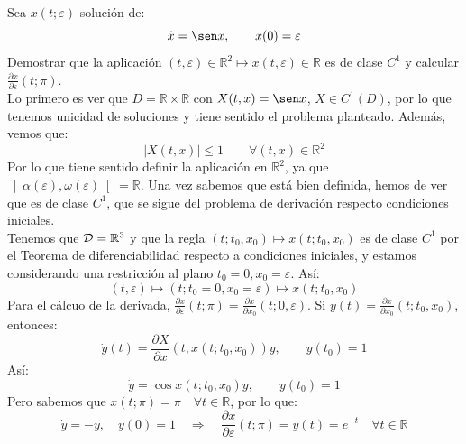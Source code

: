 \documentclass[12pt]{article}
\begin{document}
    \newpage
    \begin{ejercicio}
        Sea $x(t;\varepsilon)$ solución de:
        \begin{equation*}
            \dot{x} = \sen x, \qquad x(0) = \varepsilon
        \end{equation*}
        Demostrar que la aplicación $(t,\varepsilon)\in \mathbb{R}^2\longmapsto x(t,\varepsilon)\in \mathbb{R}$ es de clase $C^1$ y calcular $\frac{\partial x}{\partial \varepsilon}(t;\pi)$.\\

        \noindent
        Lo primero es ver que $D = \mathbb{R}\times \mathbb{R}$ con $X(t,x)=\sen x$, $X\in C^1(D)$,  por lo que tenemos unicidad de soluciones y tiene sentido el problema planteado. Además, vemos que:
        \begin{equation*}
            |X(t,x)| \leq 1 \qquad \forall (t,x)\in \mathbb{R}^2
        \end{equation*}
        Por lo que tiene sentido definir la aplicación en $\mathbb{R}^2$, ya que $\left]\alpha(\varepsilon),\omega(\varepsilon)\right[= \mathbb{R}$. Una vez sabemos que está bien definida, hemos de ver que es de clase $C^1$, que se sigue del problema de derivación respecto condiciones iniciales.\\

        \noindent
        Tenemos que $\mathcal{D} = \mathbb{R}^3$ y que la regla $(t;t_0,x_0)\longmapsto x(t;t_0,x_0)$ es de clase $C^1$ por el Teorema de diferenciabilidad respecto a condiciones iniciales, y estamos considerando una restricción al plano $t_0=0, x_0=\varepsilon$. Así:
        \begin{equation*}
            (t,\varepsilon)\longmapsto (t;t_0=0,x_0=\varepsilon)\longmapsto x(t;t_0,x_0)
        \end{equation*}
        Para el cálcuo de la derivada, $\frac{\partial x}{\partial \varepsilon}(t;\pi) = \frac{\partial x}{\partial x_0}(t;0,\varepsilon)$. Si $y(t) = \frac{\partial x}{\partial x_0}(t;t_0,x_0)$, entonces:
        \begin{equation*}
            \dot{y}(t) = \frac{\partial X}{\partial x}(t,x(t;t_0,x_0))y, \qquad y(t_0) = 1
        \end{equation*}
        Así:
        \begin{equation*}
            \dot{y} = \cos x(t;t_0,x_0) y, \qquad y(t_0) = 1
        \end{equation*}
        Pero sabemos que $x(t;\pi) = \pi \quad \forall t\in \mathbb{R}$, por lo que:
        \begin{equation*}
            \dot{y} = -y, \quad y(0) = 1 \quad\Longrightarrow\quad \frac{\partial x}{\partial \varepsilon}(t;\pi) = y(t) = e^{-t} \quad \forall t\in \mathbb{R}
        \end{equation*}
    \end{ejercicio}
\end{document}
